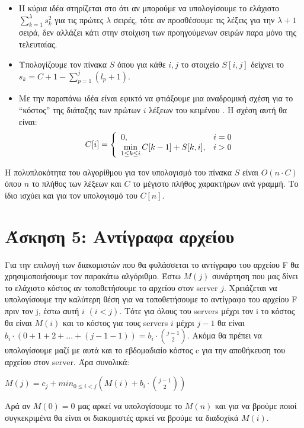 \documentclass[a4paper,12pt]{report}
\begin{document}
\begin{itemize}
 \item Η κύρια ιδέα στηρίζεται στο ότι αν μπορούμε να υπολογίσουμε το ελάχιστο $\sum_{k=1}^{\lambda}{s_k^2}$ για τις πρώτες $\lambda$ σειρές, τότε αν προσθέσουμε τις λέξεις για την $\lambda+1$ σειρά, δεν αλλάζει κάτι στην στοίχιση των προηγούμενων σειρών παρα μόνο της τελευταίας.
 \item Υπολογίζουμε τον πίνακα $S$ όπου για κάθε $i,j$ το στοιχείο $S[i,j]$ δείχνει το $s_k=C+1-\sum_{p=1}^{j}{(l_p+1)}$.
 \item Με την παραπάνω ιδέα είναι εφικτό να φτιάξουμε μια αναδρομική σχέση για το ``κόστος'' της διάταξης των πρώτων $i$ λέξεων του κειμένου . Η σχέση αυτή θα είναι:
  $$
   C[i]=\left\{\begin{array}{l l}
           0, & i=0 \\
	  \displaystyle \min_{1 \leq k \leq i}C[k-1]+S[k,i], & i>0
          \end{array} \right.
  $$ 

\end{itemize}


H πολυπλοκότητα του αλγορίθμου για τον υπολογισμό του πίνακα $S$ είναι $O(n \cdot C)$ όπου $n$ το πλήθος των λέξεων και $C$ το μέγιστο πλήθος χαρακτήρων ανά γραμμή. Το ίδιο ισχύει και για τον υπολογισμό του $C[n]$.

\section*{Άσκηση 5: Αντίγραφα αρχείου}
Για την επιλογή των διακομιστών που θα φυλάσσεται το αντίγραφο του αρχείου F θα χρησιμοποιήσουμε τον παρακάτω αλγόριθμο. Έστω $M(j)$ συνάρτηση που μας δίνει το ελάχιστο κόστος αν τοποθετήσουμε το αρχείου στον server $j$. Χρειάζεται να υπολογίσουμε την καλύτερη θέση για να τοποθετήσουμε το αντίγραφο του αρχείου F πριν τον j, έστω αυτή $i$ $(i<j)$. Tότε για όλους του servers μέχρι τον i το κόστος θα είναι $M(i)$ και το κόστος για τους  servers $i$ μέχρι $j-1$ θα είναι $b_i \cdot (0+1+2+...+(j-1-1)) = b_i \cdot \binom {j-1}{2} $. Ακόμα θα πρέπει να υπολογίσουμε μαζί με αυτά και το εβδομαδιαίο κόστος c για την αποθήκευση του αρχείου στον server. Άρα συνολικά:
\begin{center}
 $M(j)=c_j + min_{0 \leq i<j}(M(i)+b_i \cdot \binom {j-1}{2})$
\end{center}

Αρά αν $M(0)=0$ μας αρκεί να υπολογίσουμε το $M(n)$ και για να βρούμε ποιοί συγκεκριμένα θα είναι οι διακομιστές αρκεί να βρούμε τα διαδοχίκά $Μ(i)$. 
\end{document}
